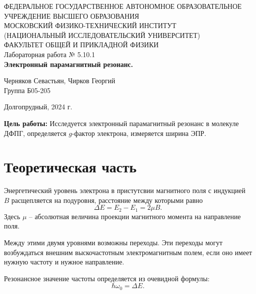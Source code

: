 \documentclass[a4paper,12pt]{article} %
\begin{document}
\begin{center}
	\footnotesize{ФЕДЕРАЛЬНОЕ ГОСУДАРСТВЕННОЕ АВТОНОМНОЕ ОБРАЗОВАТЕЛЬНОЕ 			УЧРЕЖДЕНИЕ ВЫСШЕГО ОБРАЗОВАНИЯ}\\
	\footnotesize{МОСКОВСКИЙ ФИЗИКО-ТЕХНИЧЕСКИЙ ИНСТИТУТ\\(НАЦИОНАЛЬНЫЙ 			ИССЛЕДОВАТЕЛЬСКИЙ УНИВЕРСИТЕТ)}\\
	\footnotesize{ФАКУЛЬТЕТ ОБЩЕЙ И ПРИКЛАДНОЙ ФИЗИКИ\\}
	\hfill \break
	\hfill\break
	\hfill\break
	\hfill \break
	\hfill \break
	\hfill \break
	\hfill \break
	\hfill \break
	\hfill \break
	\hfill \break
	\hfill \break
	\hfill \break
	\hfill \break
	\hfill \break
	\large{Лабораторная работа № 5.10.1 \\\textbf{Электронный парамагнитный резонанс.}}\\
	\hfill \break
	\hfill \break
	\hfill \break
	\begin{flushright}
		Черняков Севастьян, Чирков Георгий\\
		Группа Б05-205
	\end{flushright}
	\hfill \break
	\hfill \break
	\hfill \break
	\hfill \break
	\hfill \break
	\hfill \break
	\hfill \break
	\hfill \break
	\hfill \break
	\hfill \break
	\hfill \break
\end{center}
\begin{center}
	Долгопрудный, 2024 г.
\end{center}
\thispagestyle{empty}
\newpage
	\textbf{Цель работы:} Исследуется электронный парамагнитный резонанс в молекуле ДФПГ, определяется $g$-фактор электрона, измеряется ширина ЭПР.

\section{Теоретическая часть}
	Энергетический уровень электрона в пристутсвии магнитного поля с индукцией $B$ расщепляется на подуровня, расстояние между которыми равно 
	\begin{equation}
		\label{eq:dE}
		\Delta E = E_2 - E_1 = 2\mu B.
	\end{equation}
	Здесь $\mu$ -- абсолютная величина проекции магнитного момента на направление поля.
	
	Между этими двумя уровнями возможны переходы. Эти переходы могут возбуждаться внешним выскочастотным электромагнитным полем, если оно имеет нужную частоту и нужное направление.
	
	Резонансное значение частоты определяется из очевидной формулы:
	\begin{equation}
		\label{eq:resonans_omega}
		\hbar \omega_0 = \Delta E.
	\end{equation}
\end{document}
